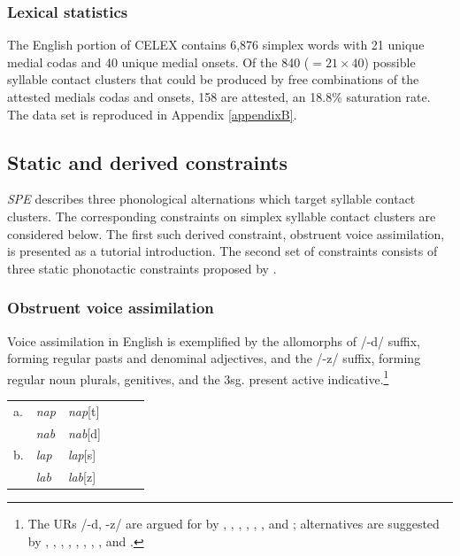 \subsubsection{Lexical statistics}

The English portion of CELEX contains 6,876 simplex words with 21 unique medial codas and 40 unique medial onsets. Of the 840 ($= 21 \times 40$) possible syllable contact clusters that could be produced by free combinations of the attested medials codas and onsets, 158 are attested, an 18.8\% saturation rate. The data set is reproduced in Appendix \ref{appendixB}.

\subsection{Static and derived constraints}

\emph{SPE} describes three phonological alternations which target syllable contact clusters. The corresponding constraints on simplex syllable contact clusters are considered below. The first such derived constraint, obstruent voice assimilation, is presented as a tutorial introduction. The second set of constraints consists of three static phonotactic constraints proposed by \citet{Pierrehumbert1994}.

\subsubsection{Obstruent voice assimilation} \label{ova}

Voice assimilation in English is exemplified by the allomorphs of /-d/ suffix, forming regular pasts and denominal adjectives, and the /-z/ suffix, forming regular noun plurals, genitives, and the 3sg. present active indicative.\footnote{The URs /-d, -z/ are argued for by \citet[282]{Hockett1958}, \citet[210]{SPE}, \citet{Basboll1972}, \citet{Shibatani1972}, \citet{Anderson1973a}, \citet[102]{Pinker1988}, and \citet[284f.]{Bakovic2005b}; alternatives are suggested by \citet[210f.]{LANGUAGE}, \citet[426]{Nida1948}, \citet{Luelsdorff1969}, \citet{Lightner1970}, \citet{Hoard1971}, \citet{Miner1975}, \citet{Zwicky1975}, \citet{Kiparsky1985}, and \citet[135]{Borowsky1986}.}

\begin{example}
\begin{tabular}{llllll}
a. & \emph{nap} & \emph{nap}[t] \\
   & \emph{nab} & \emph{nab}[d] \\
b. & \emph{lap} & \emph{lap}[s] \\
   & \emph{lab} & \emph{lab}[z] \\
\end{tabular}
\end{example}

